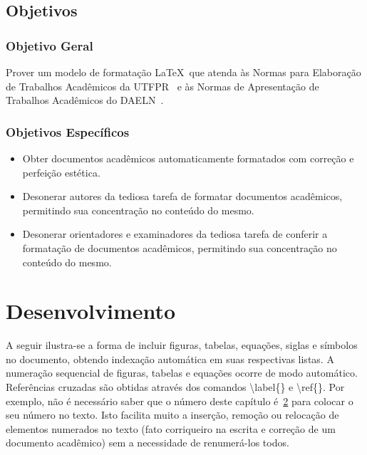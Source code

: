 \documentclass[openright]{normas-utf-tex} %
\begin{document}
\section{Objetivos}

\subsection{Objetivo Geral}

Prover um modelo de formata\c{c}\~ao \LaTeX\ que atenda \`as Normas para Elabora\c{c}\~ao de Trabalhos Acad\^emicos da UTFPR~\cite{UTFPR2008} e \`as Normas de Apresenta\c{c}\~ao de Trabalhos Acad\^emicos do DAELN~\cite{DAELN2006}.

\subsection{Objetivos Específicos}

\begin{itemize}
	\item Obter documentos acad\^emicos automaticamente formatados com corre\c{c}\~ao e perfei\c{c}\~ao est\'etica.
	\item Desonerar autores da tediosa tarefa de formatar documentos acad\^emicos, permitindo sua concentra\c{c}\~ao no conte\'udo do mesmo.
	\item Desonerar orientadores e examinadores da tediosa tarefa de conferir a formata\c{c}\~ao de documentos acad\^emicos, permitindo sua concentra\c{c}\~ao no conte\'udo do mesmo.
\end{itemize}


\chapter{Desenvolvimento}
\label{chap:desenv}

A seguir ilustra-se a forma de incluir figuras, tabelas, equa\c{c}\~oes, siglas e s\'imbolos no documento, obtendo indexa\c{c}\~ao autom\'atica em suas respectivas listas. A numera\c{c}\~ao sequencial de figuras, tabelas e equa\c{c}\~oes ocorre de modo autom\'atico. Refer\^encias cruzadas s\~ao obtidas atrav\'es dos comandos {\ttfamily \textbackslash label\{\}} e {\ttfamily \textbackslash ref\{\}}. Por exemplo, n\~ao \'e necess\'ario saber que o n\'umero deste cap\'itulo \'e~\ref{chap:desenv} para colocar o seu n\'umero no texto. Isto facilita muito a inser\c{c}\~ao, remo\c{c}\~ao ou reloca\c{c}\~ao de elementos numerados no texto (fato corriqueiro na escrita e corre\c{c}\~ao de um documento acad\^emico) sem a necessidade de renumer\'a-los todos.
\end{document}
